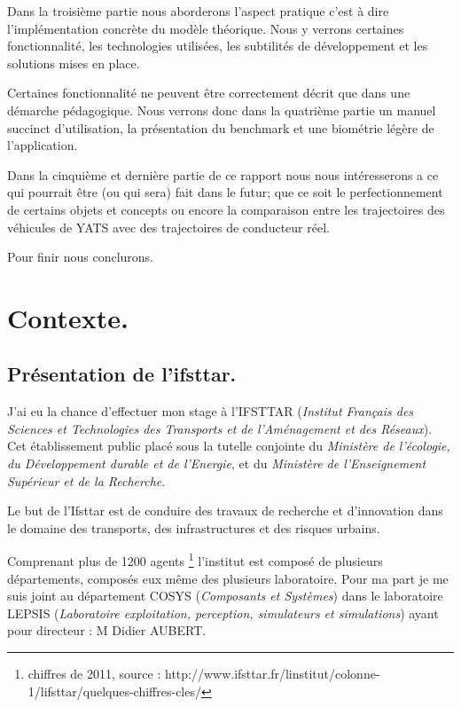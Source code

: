 \documentclass[a4paper,11pt]{article}
\begin{document}
Dans la troisième partie nous aborderons l'aspect pratique c'est à dire l'implémentation concrète du modèle théorique. Nous y verrons certaines fonctionnalité, les technologies utilisées, les subtilités de développement et les solutions mises en place. 

Certaines fonctionnalité ne peuvent être correctement décrit que dans une démarche pédagogique. Nous verrons donc dans la quatrième partie un manuel succinct d'utilisation, la présentation du benchmark et une biométrie légère de l'application.

Dans la cinquième et dernière partie de ce rapport nous nous intéresserons a ce qui pourrait être (ou qui sera) fait dans le futur; que ce soit le perfectionnement de certains objets et concepts ou encore la comparaison entre les trajectoires des véhicules de YATS avec des trajectoires de conducteur réel. 

Pour finir nous conclurons.


\newpage


\section{Contexte.}
\subsection{Présentation de l'ifsttar.}
J'ai eu la chance d'effectuer mon stage à l'IFSTTAR (\textit{Institut Français des Sciences et Technologies des Transports et de l'Aménagement et des Réseaux}). Cet établissement public placé sous la tutelle conjointe du \textit{Ministère de l'écologie, du Développement durable et de l'Energie}, et du \textit{Ministère de l'Enseignement Supérieur et de la Recherche}.

Le but de l'Ifsttar est de conduire des travaux de recherche et d'innovation dans le domaine des transports, des infrastructures et des risques urbains. 

Comprenant plus de 1200 agents \footnote{chiffres de 2011, source : http://www.ifsttar.fr/linstitut/colonne-1/lifsttar/quelques-chiffres-cles/} l'institut est composé de plusieurs départements, composés eux même des plusieurs laboratoire. Pour ma part je me suis joint au département COSYS (\textit{Composants et Systèmes}) dans le laboratoire LEPSIS (\textit{Laboratoire exploitation, perception, simulateurs et simulations}) ayant pour directeur : M Didier AUBERT.
\end{document}
